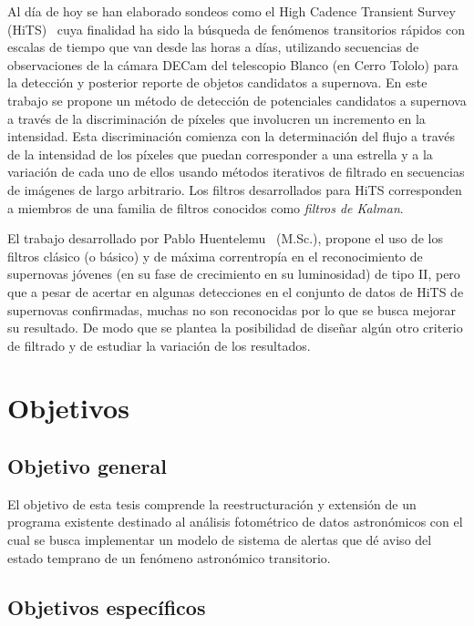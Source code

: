 Al d\'ia de hoy se han elaborado sondeos como el High Cadence Transient Survey (HiTS)~\cite{hits} cuya finalidad ha sido la b\'usqueda de fen\'omenos transitorios r\'apidos con escalas de tiempo que van desde las horas a d\'ias, utilizando secuencias de observaciones de la c\'amara DECam del telescopio Blanco (en Cerro Tololo) para la detecci\'on y posterior reporte de objetos candidatos a supernova. En este trabajo se propone un m\'etodo de detecci\'on de potenciales candidatos a supernova a trav\'es de la discriminaci\'on de p\'ixeles que involucren un incremento en la intensidad. Esta discriminaci\'on comienza con la determinaci\'on del flujo a trav\'es de la intensidad de los p\'ixeles que puedan corresponder a una estrella y a la variaci\'on de cada uno de ellos usando m\'etodos iterativos de filtrado en secuencias de im\'agenes de largo arbitrario. Los filtros desarrollados para HiTS corresponden a miembros de una familia de filtros conocidos como \textit{filtros de Kalman}.%
\bigskip


El trabajo desarrollado por Pablo Huentelemu~\cite{huentelemu} (M.Sc.), propone el uso de los filtros cl\'asico (o b\'asico) \cite{kalman} y de m\'axima correntrop\'ia \cite{chen} en el reconocimiento de supernovas j\'ovenes (en su fase de crecimiento en su luminosidad) de tipo II, pero que a pesar de acertar en algunas detecciones en el conjunto de datos de HiTS de supernovas confirmadas, muchas no son reconocidas por lo que se busca mejorar su resultado. De modo que se plantea la posibilidad de dise\~nar alg\'un otro criterio de filtrado y de estudiar la variaci\'on de los resultados.
\bigskip


\section{Objetivos}
\subsection{Objetivo general}
El objetivo de esta tesis comprende la reestructuraci\'on y extensi\'on de un programa existente destinado al an\'alisis fotom\'etrico de datos astron\'omicos con el cual se busca implementar un modelo de sistema de alertas que d\'e aviso del estado temprano de un fen\'omeno astron\'omico transitorio. 
\bigskip

\subsection{Objetivos espec\'ificos}

